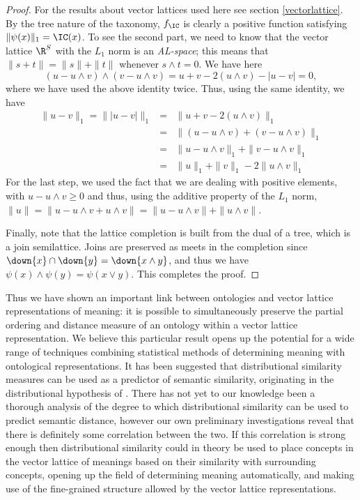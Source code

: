 \begin{proof}
For the results about vector lattices used here see section \ref{vectorlattice}. By the tree nature of the taxonomy, $f_\IC$ is clearly a positive function satisfying $\|\psi(x)\|_1 = \IC(x)$. To see the second part, we need to know that the vector lattice $\R^S$ with the $L_1$ norm is an \emph{AL-space}; this means that $\|s + t\| = \|s\| + \|t\|$ whenever $s \land t = 0$. We have here
$$(u - u\land v)\land (v - u\land v)  = u + v - 2(u\land v) - |u - v| = 0,$$
where we have used the above identity twice. Thus, using the same identity, we have
\begin{eqnarray*}
 \|u - v\|_1 = \| |u - v| \|_1&=& \|u + v - 2(u \land v)\|_1\\
		&=& \|(u - u\land v) + (v - u \land v)\|_1\\
		&=& \|u - u\land v \|_1 + \|v - u \land v \|_1\\
		&=& \|u\|_1 + \|v\|_1 -2\|u\land v\|_1
\end{eqnarray*}
For the last step, we used the fact that we are dealing with positive elements, with $u - u\land v \ge 0$ and thus, using the additive property of the $L_1$ norm, $\|u\| = \|u - u\land v + u\land v\| = \|u - u\land v\| + \|u\land v\|$.

Finally, note that the lattice completion is built from the dual of a tree, which is a join semilattice. Joins are preserved as meets in the completion since $\down{x} \cap \down{y} = \down{x \land y}$, and thus we have $\psi(x) \land \psi(y) = \psi(x\lor y)$. This completes the proof.
\end{proof}

Thus we have shown an important link between ontologies and vector lattice representations of meaning: it is possible to simultaneously preserve the partial ordering and distance measure of an ontology within a vector lattice representation. We believe this particular result opens up the potential for a wide range of techniques combining statistical methods of determining meaning with ontological representations. It has been suggested that distributional similarity measures can be used as a predictor of semantic similarity, originating in the distributional hypothesis of \cite{Harris:68}. There has not yet to our knowledge been a thorough analysis of the degree to which distributional similarity can be used to predict semantic distance, however our own preliminary investigations reveal that there is definitely some correlation between the two. If this correlation is strong enough then distributional similarity could in theory be used to place concepts in the vector lattice of meanings based on their similarity with surrounding concepts, opening up the field of determining meaning automatically, and making use of the fine-grained structure allowed by the vector lattice representations.


